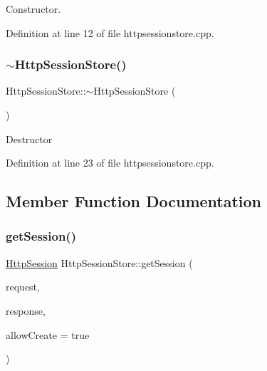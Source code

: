 Constructor. 

Definition at line 12 of file httpsessionstore.\+cpp.

\mbox{\label{classstefanfrings_1_1_http_session_store_a06062155c1dc31ede2cbc5f31bce4df3}} 
\subsubsection{\texorpdfstring{$\sim$\+Http\+Session\+Store()}{~HttpSessionStore()}}
{\footnotesize\ttfamily Http\+Session\+Store\+::$\sim$\+Http\+Session\+Store (\begin{DoxyParamCaption}{ }\end{DoxyParamCaption})\hspace{0.3cm}{\ttfamily [virtual]}}

Destructor 

Definition at line 23 of file httpsessionstore.\+cpp.



\subsection{Member Function Documentation}
\mbox{\label{classstefanfrings_1_1_http_session_store_aeaf8409e1844366c12f18fd34d477a31}} 
\subsubsection{\texorpdfstring{get\+Session()}{getSession()}\hspace{0.1cm}{\footnotesize\ttfamily [1/2]}}
{\footnotesize\ttfamily \mbox{\hyperlink{classstefanfrings_1_1_http_session}{Http\+Session}} Http\+Session\+Store\+::get\+Session (\begin{DoxyParamCaption}\item[{\mbox{\hyperlink{classstefanfrings_1_1_http_request}{Http\+Request}} \&}]{request,  }\item[{\mbox{\hyperlink{classstefanfrings_1_1_http_response}{Http\+Response}} \&}]{response,  }\item[{bool}]{allow\+Create = {\ttfamily true} }\end{DoxyParamCaption})}


